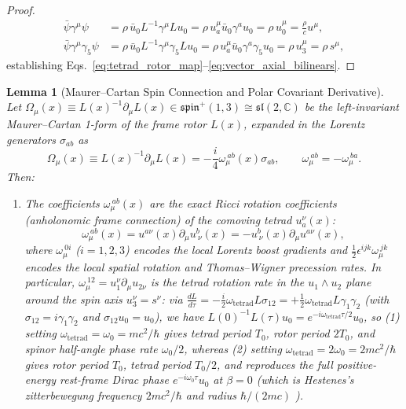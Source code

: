 \documentclass[11pt, a4paper]{article}
\newtheorem{lemma}[theorem]{Lemma}
\theoremstyle{definition}
\begin{document}
\begin{proof}
\begin{align}
\bar{\psi}\gamma^\mu\psi &= \rho\,\bar{u}_0 L^{-1}\gamma^\mu L u_0 = \rho\,u_a^\mu \bar{u}_0 \gamma^a u_0 = \rho\,u_0^\mu = \frac{\rho}{c}u^\mu, \\
\bar{\psi}\gamma^\mu\gamma_5\psi &= \rho\,\bar{u}_0 L^{-1}\gamma^\mu \gamma_5 L u_0 = \rho\,u_a^\mu \bar{u}_0 \gamma^a \gamma_5 u_0 = \rho\,u_3^\mu = \rho\,s^\mu,
\end{align}
establishing Eqs.~\eqref{eq:tetrad_rotor_map}--\eqref{eq:vector_axial_bilinears}.
\end{proof}

\begin{lemma}[Maurer--Cartan Spin Connection and Polar Covariant Derivative]
\label{lem:maurer_cartan}
Let $\Omega_\mu(x) \equiv L(x)^{-1}\partial_\mu L(x) \in \mathfrak{spin}^+(1,3) \cong \mathfrak{sl}(2,\mathbb{C})$ be the left-invariant Maurer--Cartan 1-form of the frame rotor $L(x)$, expanded in the Lorentz generators $\sigma_{ab}$ as
\begin{equation}
\label{eq:maurer_cartan_def}
\Omega_\mu(x) \equiv L(x)^{-1} \partial_\mu L(x) = -\frac{i}{4} \omega_\mu^{\ ab}(x) \sigma_{ab}, \qquad \omega_\mu^{\ ab} = -\omega_\mu^{\ ba}.
\end{equation}
Then:
\begin{enumerate}[label=(\roman*)]
    \item The coefficients $\omega_\mu^{\ ab}(x)$ are the exact Ricci rotation coefficients (anholonomic frame connection) of the comoving tetrad $u_a^\nu(x)$:
    \begin{equation}
    \label{eq:ricci_rotation_coeffs}
    \omega_\mu^{\ ab}(x) = u^{a\nu}(x) \partial_\mu u^b_{\ \nu}(x) = -u^b_{\ \nu}(x) \partial_\mu u^{a\nu}(x),
    \end{equation}
    where $\omega_\mu^{\ 0i}$ ($i=1,2,3$) encodes the local Lorentz boost gradients and $\frac{1}{2}\epsilon^{ijk}\omega_\mu^{\ jk}$ encodes the local spatial rotation and Thomas--Wigner precession rates. In particular, $\omega_\mu^{\ 12} = u_1^\nu \partial_\mu u_{2\nu}$ is the tetrad rotation rate in the $u_1 \wedge u_2$ plane around the spin axis $u_3^\nu = s^\nu$: via $\frac{dL}{d\tau} = -\frac{i}{2}\omega_{\text{tetrad}}L\sigma_{12} = +\frac{1}{2}\omega_{\text{tetrad}}L\gamma_1\gamma_2$ (with $\sigma_{12} = i\gamma_1\gamma_2$ and $\sigma_{12}u_0 = u_0$), we have $L(0)^{-1}L(\tau)u_0 = e^{-i\omega_{\text{tetrad}}\tau/2}u_0$, so (1) setting $\omega_{\text{tetrad}} = \omega_0 = mc^2/\hbar$ gives tetrad period $T_0$, rotor period $2T_0$, and spinor half-angle phase rate $\omega_0 / 2$, whereas (2) setting $\omega_{\text{tetrad}} = 2\omega_0 = 2mc^2/\hbar$ gives rotor period $T_0$, tetrad period $T_0/2$, and reproduces the full positive-energy rest-frame Dirac phase $e^{-i\omega_0\tau}u_0$ at $\beta = 0$ (which is Hestenes's \textit{zitterbewegung} frequency $2mc^2/\hbar$ and radius $\hbar/(2mc)$ \cite{Hestenes1990}).

\end{enumerate}
\end{lemma}
\end{document}
